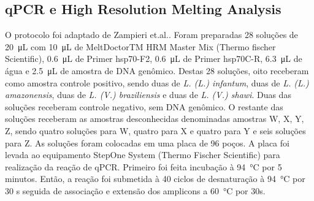      
\subsection{qPCR e High Resolution Melting Analysis}

O protocolo foi adaptado de Zampieri et.al.\cite{HRMzampi2016}.  Foram
preparadas 28 soluções de \qty{20}{\micro\liter} com \qty{10}{\micro\liter} de
MeltDoctorTM HRM Master Mix (Thermo fischer Scientific), \qty{0,6}{\micro\liter}
de Primer hsp70-F2, \qty{0,6}{\micro\liter} de Primer hsp70C-R,
\qty{6,3}{\micro\liter} de água e \qty{2,5}{\micro\liter} de amostra de DNA
genômico. Destas 28 soluções, oito receberam como amostra controle positivo,
sendo duas de \textit{L. (L.) infantum}, duas de \textit{L. (L.) amazonensis},
duas de \textit{L. (V.) braziliensis} e duas de \textit{L. (V.) shawi}. Duas das
soluções receberam controle negativo, sem DNA genômico. O restante das soluções
receberam as amostras desconhecidas denominadas amostras W, X, Y, Z, sendo
quatro soluções para W, quatro para  X e quatro para Y e seis soluções para Z.
As soluções foram colocadas em uma placa de 96 poços. A placa foi levada ao
equipamento StepOne System (Thermo Fischer Scientific) para realização da reação
de qPCR. Primeiro foi feita incubação à \qty{94}{\celsius} por 5 minutos.
Então, a reação foi submetida à 40 ciclos de desnaturação à \qty{94}{\celsius}
por 30 s seguida de associação e extensão dos amplicons  a \qty{60}{\celsius}
por 30s. 


